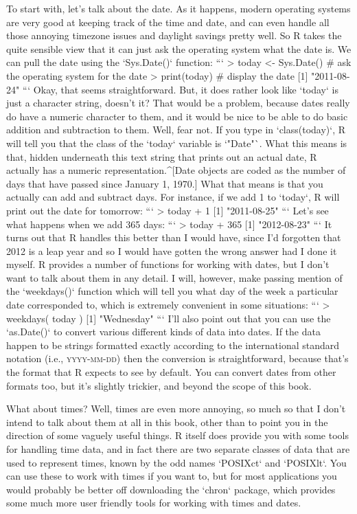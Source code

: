 To start with, let's talk about the date. As it happens, modern operating systems are very good at keeping track of the time and date, and can even handle all those annoying timezone issues and daylight savings pretty well. So R takes the quite sensible view that it can just ask the operating system what the date is. We can pull the date using the `Sys.Date()` function:
```
> today <- Sys.Date()  # ask the operating system for the date
> print(today)         # display the date
[1] "2011-08-24"
```
Okay, that seems straightforward. But, it does rather look like `today` is just a character string, doesn't it? That would be a problem, because dates really do have a numeric character to them, and it would be nice to be able to do basic addition and subtraction to them. Well, fear not. If you type in `class(today)`, R will tell you that the class of the `today` variable is `"Date"`. What this means is that, hidden underneath this text string that prints out an actual date, R actually has a numeric representation.^[Date objects are coded as the number of days that have passed since January 1, 1970.] What that means is that you actually can add and subtract days. For instance, if we add 1 to `today`, R will print out the date for tomorrow:
```
> today + 1
[1] "2011-08-25"
```
Let's see what happens when we add 365 days:
```
> today + 365
[1] "2012-08-23"
```
It turns out that R handles this better than I would have, since I'd forgotten that 2012 is a leap year and so I would have gotten the wrong answer had I done it myself. R provides a number of functions for working with dates, but I don't want to talk about them in any detail. I will, however, make passing mention of the `weekdays()` function which will tell you what day of the week a particular date corresponded to, which is extremely convenient in some situations:
``` 
> weekdays( today )
[1] "Wednesday"
```
I'll also point out that you can use the `as.Date()` to convert various different kinds of data into dates. If the data happen to be strings formatted exactly according to the international standard notation (i.e., \textsc{yyyy-mm-dd}) then the conversion is straightforward, because that's the format that R expects to see by default. You can convert dates from other formats too, but it's slightly trickier, and beyond the scope of this book.

What about times? Well, times are even more annoying, so much so that I don't intend to talk about them at all in this book, other than to point you in the direction of some vaguely useful things. R itself does provide you with some tools for handling time data, and in fact there are two separate classes of data that are used to represent times, known by the odd names `POSIXct` and `POSIXlt`. You can use these to work with times if you want to, but for most applications you would probably be better off downloading the `chron` package, which provides some much more user friendly tools for working with times and dates. 





